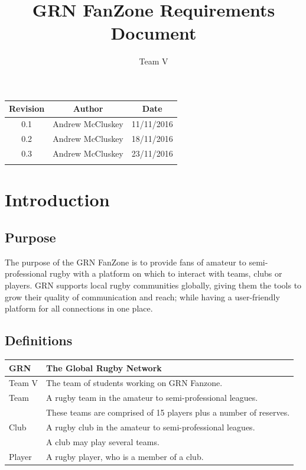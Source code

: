 \documentclass[10pt,a4paper]{article}
\author{Team V}
\title{GRN FanZone Requirements Document}
\begin{document}
\maketitle

\begin{center}
	\begin{tabular}{ |c|c|c| }
	\hline
	Revision & Author & Date \\ 
	\hline
	0.1 & Andrew McCluskey & 11/11/2016 \\
	\hline
	0.2 & Andrew McCluskey & 18/11/2016 \\
	\hline
	0.3 & Andrew McCluskey & 23/11/2016 \\
	\hline
	& & \\
	\hline
	\end{tabular}
\end{center}

\newpage
\tableofcontents
\newpage

\section{Introduction}

\subsection{Purpose}
The purpose of the GRN FanZone is to provide fans of amateur to semi-professional rugby with a platform on which to interact with teams, clubs or players. GRN supports local rugby communities globally, giving them the tools to grow their quality of communication and reach; while having a user-friendly platform for all connections in one place.

\subsection{Definitions}

\begin{tabular}{ |l|l| }
\hline
GRN & The Global Rugby Network \\ 
\hline
Team V & The team of students working on GRN Fanzone. \\
\hline
Team & A rugby team in the amateur to semi-professional leagues. \\
&These teams are comprised of 15 players plus a number of reserves. \\
\hline
Club & A rugby club in the amateur to semi-professional leagues. \\
&A club may play several teams. \\
\hline
Player & A rugby player, who is a member of a club. \\
\hline
\end{tabular}
\end{document}

